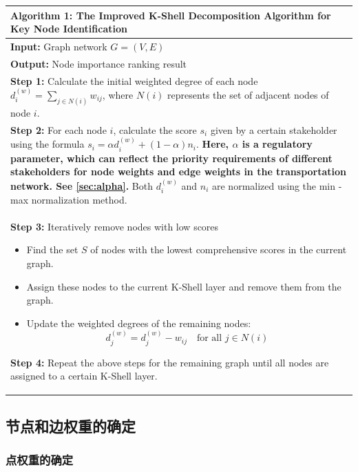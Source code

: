\documentclass[12pt, a4paper, oneside]{ctexart}
\begin{document}
\begin{table}[H]
  \centering
  \label{tab:improvedKshell}
  \begin{tabular}{@{}p{}@{}}
  \toprule
  \textbf{Algorithm 1: The Improved K-Shell Decomposition Algorithm for Key Node Identification} \\ 
  \midrule
  \textbf{Input:} Graph network \(G=(V, E)\) \\
  \textbf{Output:} Node importance ranking result \\
  \textbf{Step 1:} Calculate the initial weighted degree of each node \(d_i^{(w)}=\sum_{j\in N(i)}w_{ij}\), where \(N(i)\) represents the set of adjacent nodes of node \(i\). \\
  \textbf{Step 2:} For each node \(i\), calculate the score \(s_i\) given by a certain stakeholder using the formula \(s_i = \alpha d_i^{(w)}+(1 - \alpha)n_i\). \textbf{Here, \(\alpha\) is a regulatory parameter, which can reflect the priority requirements of different stakeholders for node weights and edge weights in the transportation network. See \ref{sec:alpha}.} Both \(d_i^{(w)}\) and \(n_i\) are normalized using the min - max normalization method. \\
  \textbf{Step 3:} Iteratively remove nodes with low scores
  \begin{itemize}
      \item Find the set \(S\) of nodes with the lowest comprehensive scores in the current graph.
      \item Assign these nodes to the current K-Shell layer and remove them from the graph.
      \item Update the weighted degrees of the remaining nodes:
      \begin{equation}
          d_j^{(w)}=d_j^{(w)}-w_{ij}\quad\text{for all }j\in N(i)
      \end{equation}
  \end{itemize}
  \textbf{Step 4:} Repeat the above steps for the remaining graph until all nodes are assigned to a certain K-Shell layer. \\ \bottomrule
  \end{tabular}
\end{table}

\subsection{节点和边权重的确定}

\subsubsection{点权重的确定}
\end{document}
